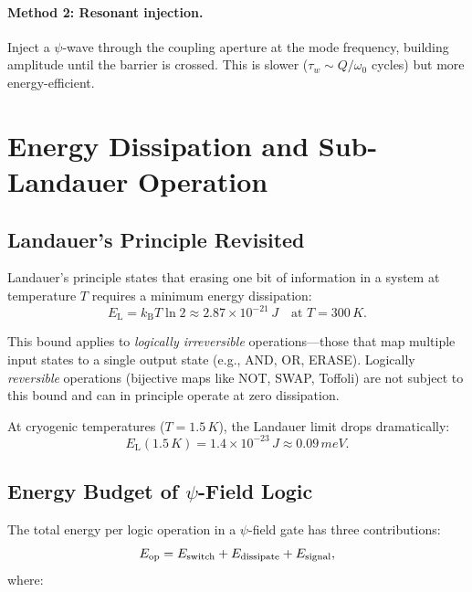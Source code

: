 \documentclass[12pt,a4paper,twoside]{article}
\newcommand{\kB}{k_{\mathrm{B}}}
\newcommand{\Landauer}{E_{\mathrm{L}}}
\begin{document}
\paragraph{Method 2: Resonant injection.} Inject a $\psi$-wave through the coupling aperture at the mode frequency, building amplitude until the barrier is crossed. This is slower ($\tau_w \sim Q/\omega_0$ cycles) but more energy-efficient.

\section{Energy Dissipation and Sub-Landauer Operation}\label{sec:energy}

\subsection{Landauer's Principle Revisited}\label{sec:landauer}

Landauer's principle states that erasing one bit of information in a system at temperature $T$ requires a minimum energy dissipation:
\begin{equation}
\Landauer = \kB T \ln 2 \approx 2.87 \times 10^{-21}\,\si{J} \quad \text{at } T = 300\,\si{K}.
\label{eq:landauer}
\end{equation}

This bound applies to \emph{logically irreversible} operations---those that map multiple input states to a single output state (e.g., AND, OR, ERASE). Logically \emph{reversible} operations (bijective maps like NOT, SWAP, Toffoli) are not subject to this bound and can in principle operate at zero dissipation.

At cryogenic temperatures ($T = 1.5\,\si{K}$), the Landauer limit drops dramatically:
\begin{equation}
\Landauer(1.5\,\si{K}) = 1.4 \times 10^{-23}\,\si{J} \approx 0.09\,\si{meV}.
\end{equation}

\subsection{Energy Budget of $\psi$-Field Logic}\label{sec:energy_budget}

The total energy per logic operation in a $\psi$-field gate has three contributions:
\begin{equation}
E_{\rm op} = E_{\rm switch} + E_{\rm dissipate} + E_{\rm signal},
\label{eq:energy_total}
\end{equation}
where:
\end{document}
